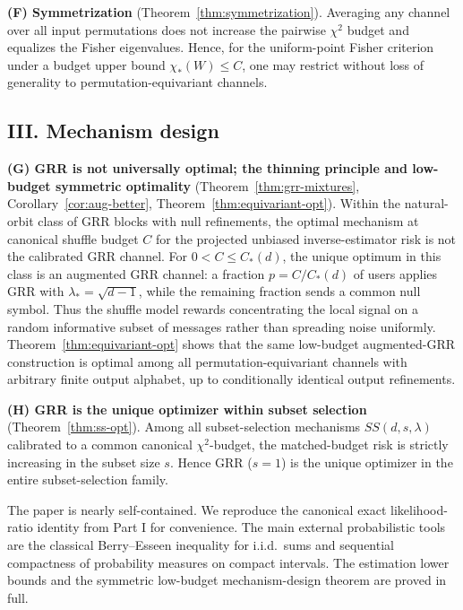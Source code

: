 \documentclass[11pt]{amsart}
\numberwithin{equation}{section}
\theoremstyle{definition}
\begin{document}
\smallskip
\noindent
\textbf{(F) Symmetrization} (Theorem~\ref{thm:symmetrization}).
Averaging any channel over all input permutations does not increase the pairwise $\chi^2$ budget
and equalizes the Fisher eigenvalues.  Hence, for the uniform-point Fisher criterion under a budget
upper bound $\chi_\ast(W)\le C$, one may
restrict without loss of generality to permutation-equivariant channels.

\subsection*{III. Mechanism design}

\smallskip
\noindent
\textbf{(G) GRR is not universally optimal; the thinning principle and low-budget symmetric optimality}
(Theorem~\ref{thm:grr-mixtures}, Corollary~\ref{cor:aug-better}, Theorem~\ref{thm:equivariant-opt}).
Within the natural-orbit class of GRR blocks with null refinements, the optimal mechanism at canonical
shuffle budget $C$ for the projected unbiased inverse-estimator risk is not the calibrated GRR channel.
For $0<C\le C_\ast(d)$, the unique optimum in this class is an augmented GRR channel:
a fraction $p=C/C_\ast(d)$ of users applies GRR with $\lambda_\ast=\sqrt{d-1}$,
while the remaining fraction sends a common null symbol.
Thus the shuffle model rewards concentrating the local signal on a random informative subset of
messages rather than spreading noise uniformly.
Theorem~\ref{thm:equivariant-opt} shows that the same low-budget augmented-GRR construction is
optimal among all permutation-equivariant channels with arbitrary finite output alphabet, up to
conditionally identical output refinements.

\smallskip
\noindent
\textbf{(H) GRR is the unique optimizer within subset selection}
(Theorem~\ref{thm:ss-opt}).
Among all subset-selection mechanisms $SS(d,s,\lambda)$ calibrated to a common canonical $\chi^2$-budget,
the matched-budget risk is strictly increasing in the subset size $s$.
Hence GRR ($s=1$) is the unique optimizer in the entire subset-selection family.

The paper is nearly self-contained.  We reproduce the canonical exact likelihood-ratio identity from
Part I for convenience.  The main external probabilistic tools are the classical Berry--Esseen
inequality for i.i.d.\ sums and sequential compactness of probability measures on compact intervals.
The estimation lower bounds and the symmetric low-budget mechanism-design theorem are proved in full.
\end{document}
